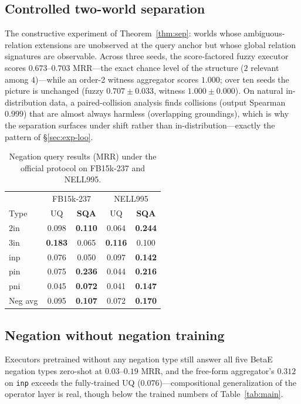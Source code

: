 \documentclass[journal]{IEEEtran}
\begin{document}
\subsection{Controlled two-world separation}\label{sec:exp-synth}

The constructive experiment of Theorem~\ref{thm:sep}: worlds whose
ambiguous-relation extensions are unobserved at the query anchor but whose
global relation signatures are observable. Across three seeds, the
score-factored fuzzy executor scores $0.673$--$0.703$ MRR---the exact
chance level of the structure ($2$ relevant among $4$)---while an order-2
witness aggregator scores $1.000$; over ten seeds the picture is
unchanged (fuzzy $0.707\pm0.033$, witness $1.000\pm0.000$). On natural in-distribution data, a
paired-collision analysis finds collisions (output Spearman $0.999$) that
are almost always harmless (overlapping groundings), which is why the
separation surfaces under shift rather than in-distribution---exactly the
pattern of \S\ref{sec:exp-loo}.

\begin{table}[t]
\centering
\caption{Negation query results (MRR) under the official protocol on
FB15k-237 and NELL995.}
\label{tab:negation}
\small
\begin{tabular}{lcc|cc}
\toprule
& \multicolumn{2}{c|}{FB15k-237} & \multicolumn{2}{c}{NELL995} \\
Type & UQ & \textbf{SQA} & UQ & \textbf{SQA} \\
\midrule
2in & 0.098 & \textbf{0.110} & 0.064 & \textbf{0.244} \\
3in & \textbf{0.183} & 0.065 & \textbf{0.116} & 0.100 \\
inp & 0.076 & 0.050 & 0.097 & \textbf{0.142} \\
pin & 0.075 & \textbf{0.236} & 0.044 & \textbf{0.216} \\
pni & 0.045 & \textbf{0.072} & 0.041 & \textbf{0.147} \\
\midrule
Neg avg & 0.095 & \textbf{0.107} & 0.072 & \textbf{0.170} \\
\bottomrule
\end{tabular}
\end{table}


\subsection{Negation without negation training}

Executors pretrained without any negation type still answer all five
BetaE negation types zero-shot at $0.03$--$0.19$ MRR, and the free-form
aggregator's $0.312$ on \texttt{inp} exceeds the fully-trained UQ
($0.076$)---compositional generalization of the operator layer is real,
though below the trained numbers of Table~\ref{tab:main}.
\end{document}
